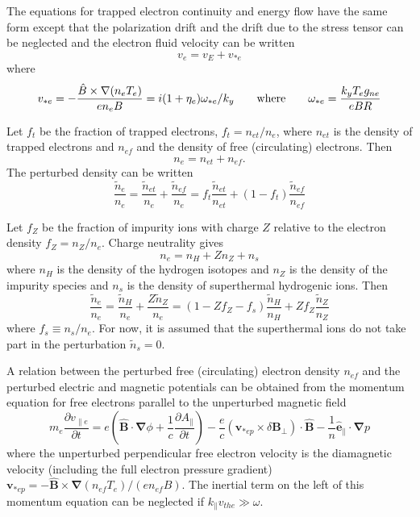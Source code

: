 The equations for trapped electron continuity and energy flow have
the same form except that the polarization drift and the drift
due to the stress tensor
can be neglected and the electron fluid velocity can be written
\[ v_e = v_E +  v_{*e}\]
where
\[ v_{*e} = -\frac{ \hat{B} \times \nabla ( n_e T_e )}{ e n_e B}
 = i ( 1 + \eta_e ) \omega_{*e} / k_y \qquad{\rm where}\qquad
 \omega_{*e} = \frac{  k_y T_e g_{ne} }{  e B R } \]

Let $f_t$ be the fraction of trapped electrons, $ f_t = n_{et} / n_e $,
where $n_{et}$ is the density of trapped electrons and
$n_{ef}$ and the density of free (circulating) electrons.  Then
\[ n_e = n_{et} + n_{ef}. \]
The perturbed density can be written
\[ \frac{\tilde{n}_e}{n_e}
 =  \frac{\tilde{n}_{et}}{n_e} + \frac{\tilde{n}_{ef}}{n_e}
 =  f_t \frac{\tilde{n}_{et}}{n_{et}}
       + ( 1 - f_t ) \frac{\tilde{n}_{ef}}{n_{ef}} \]

Let $ f_Z $ be the fraction of impurity ions with charge $Z$
relative to the electron density $ f_Z = n_Z / n_e $.
Charge neutrality gives
\[ n_e = n_H + Z n_Z + n_s \]
where $n_H$ is the density of the hydrogen isotopes and
$n_Z$ is the density of the impurity species and $n_s$ is the density of
superthermal hydrogenic ions.  Then
\[ \frac{\tilde{n}_e}{n_e}
 =  \frac{\tilde{n}_H}{n_e} + \frac{Z \tilde{n}_Z}{n_e}
 =  ( 1 - Z f_Z - f_s ) \frac{\tilde{n}_H}{n_H}
       + Z f_Z \frac{\tilde{n}_Z}{n_Z}  \]
where $ f_s \equiv n_s / n_e $.
For now, it is assumed that the superthermal ions 
do not take part in the perturbation $ \tilde{n}_s = 0.$

A relation between the perturbed free (circulating) electron density 
$ n_{ef} $ and the perturbed electric and magnetic potentials 
can be obtained from the momentum equation for free electrons parallel 
to the unperturbed magnetic field
\begin{equation}
 m_e \frac{\partial v_{\parallel e}}{\partial t}  = 
   e \left( \hat{{\mathbf B}} \cdot {\mathbf \nabla}\phi
   + \frac{1}{c} \frac{\partial A_{\parallel}}{\partial t} \right)
   - \frac{e}{c} \left( {\mathbf v}_{*ep} \times \delta {\mathbf B}_{\perp}
      \right) \cdot \hat{{\mathbf B}}
   - \frac{1}{n} \hat{{\mathbf e}}_{\parallel} \cdot {\mathbf \nabla} p 
\end{equation}
where 
the unperturbed perpendicular free electron velocity is the 
diamagnetic velocity (including the full electron pressure gradient)
$ {\mathbf v}_{*ep} = - \hat{{\mathbf B}} \times {\mathbf \nabla}
   ( n_{ef} T_e ) / ( e n_{ef} B ) $.
The inertial term on the left of this momentum equation can be neglected
if $ k_\parallel v_{the} \gg \omega $.

